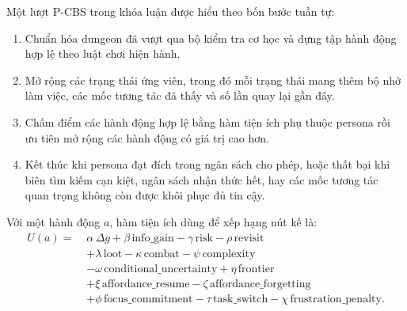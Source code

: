 \documentclass[oneside,a4paper,12pt]{extreport}
\begin{document}
Một lượt P-CBS trong khóa luận được hiểu theo bốn bước tuần tự:
\begin{enumerate}[label=\arabic*.]
  \item Chuẩn hóa dungeon đã vượt qua bộ kiểm tra cơ học và dựng tập hành động hợp lệ theo luật chơi hiện hành.
  \item Mở rộng các trạng thái ứng viên, trong đó mỗi trạng thái mang thêm bộ nhớ làm việc, các mốc tương tác đã thấy và số lần quay lại gần đây.
  \item Chấm điểm các hành động hợp lệ bằng hàm tiện ích phụ thuộc persona rồi ưu tiên mở rộng các hành động có giá trị cao hơn.
  \item Kết thúc khi persona đạt đích trong ngân sách cho phép, hoặc thất bại khi biên tìm kiếm cạn kiệt, ngân sách nhận thức hết, hay các mốc tương tác quan trọng không còn được khôi phục đủ tin cậy.
\end{enumerate}
Với một hành động $a$, hàm tiện ích dùng để xếp hạng nút kế là:
\begin{equation}
\begin{aligned}
U(a)=\;&\alpha \,\Delta g+\beta \,\mathrm{info\_gain}
-\gamma \,\mathrm{risk}
-\rho \,\mathrm{revisit} \\
&+\lambda \,\mathrm{loot}
-\kappa \,\mathrm{combat}
-\psi \,\mathrm{complexity} \\
&
-\omega \,\mathrm{conditional\_uncertainty}
+\eta \,\mathrm{frontier} \\
&+\xi \,\mathrm{affordance\_resume}
-\zeta \,\mathrm{affordance\_forgetting} \\
&
+\phi \,\mathrm{focus\_commitment}
-\tau \,\mathrm{task\_switch}
-\chi \,\mathrm{frustration\_penalty}.
\end{aligned}
\end{equation}
\end{document}
